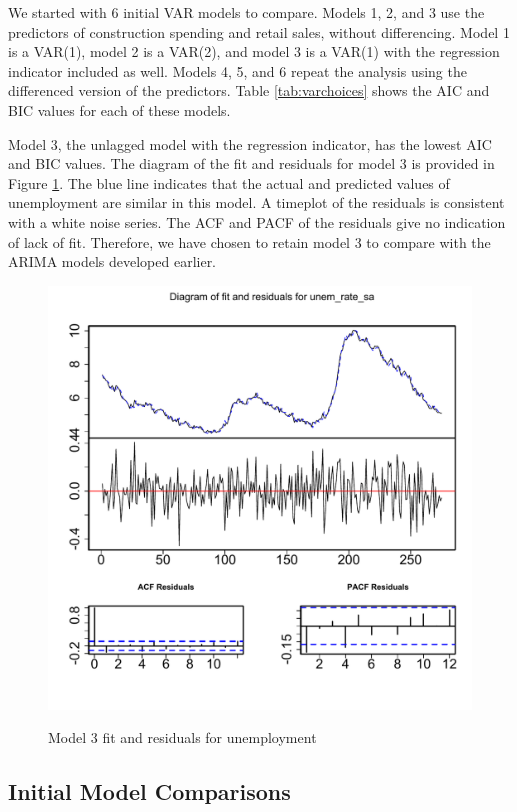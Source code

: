 \documentclass[twoside,twocolumn]{article}
\begin{document}
We started  with 6 initial VAR models to compare. Models 1, 2, and 3 use the predictors of construction spending and retail sales, without differencing. Model 1 is a VAR(1), model 2 is a VAR(2), and model 3 is a VAR(1) with the regression indicator included as well. Models 4, 5, and 6 repeat the analysis using the differenced version of the predictors. Table \ref{tab:varchoices} shows the AIC and BIC values for each of these models.  

Model 3, the unlagged model with the regression indicator, has the lowest AIC and BIC values.  The diagram of the fit and residuals for model 3 is provided in Figure \ref{fig:varfitmodel3}. The blue line indicates that the actual and predicted values of unemployment are similar in this model. A timeplot of the residuals is consistent with a white noise series. The ACF and PACF of the residuals give no indication of lack of fit. Therefore, we have chosen to retain model 3 to compare with the ARIMA models developed earlier. 


   \begin{figure}[htb]
    	\centering
     	\caption{Model 3 fit and residuals for unemployment}
     	\includegraphics[width=\linewidth]{images/varfitmodel3}
     	\label{fig:varfitmodel3}
 \end{figure}
 
\subsection{Initial Model Comparisons}
\end{document}
